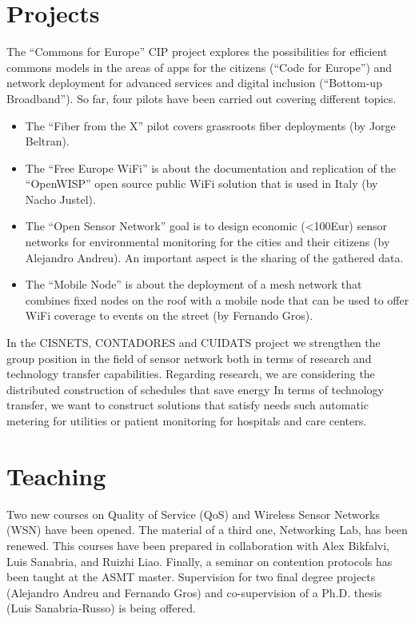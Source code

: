 \documentclass[a4paper,twocolumns]{article}%
\begin{document}
\section{Projects}

The ``Commons for Europe'' CIP project explores the possibilities for efficient commons models in the areas of apps for the citizens (``Code for Europe'') and network deployment for advanced services and digital inclusion (``Bottom-up Broadband'').
So far, four pilots have been carried out covering different topics.
\begin{itemize}
\item The ``Fiber from the X'' pilot covers grassroots fiber deployments (by Jorge Beltran).
\item The ``Free Europe WiFi'' is about the documentation and replication of the ``OpenWISP'' open source public WiFi solution that is used in Italy (by Nacho Justel).
\item The ``Open Sensor Network'' goal is to design economic (<100Eur) sensor networks for environmental monitoring for the cities and their citizens (by Alejandro Andreu). 
An important aspect is the sharing of the gathered data.
\item The ``Mobile Node'' is about the deployment of a mesh network that combines fixed nodes on the roof with a mobile node that can be used to offer WiFi coverage to events on the street (by Fernando Gros).
\end{itemize}

In the CISNETS, CONTADORES and CUIDATS project we strengthen the group position in the field of sensor network both in terms of research and technology transfer capabilities.
Regarding research, we are considering the distributed construction of schedules that save energy
In terms of technology transfer, we want to construct solutions that satisfy needs such automatic metering for utilities or patient monitoring for hospitals and care centers.

\section{Teaching}

Two new courses on Quality of Service (QoS) and Wireless Sensor Networks (WSN) have been opened.
The material of a third one, Networking Lab, has been renewed.
This courses have been prepared in collaboration with Alex Bikfalvi, Luis Sanabria, and Ruizhi Liao.
Finally, a seminar on contention protocols has been taught at the ASMT master.
Supervision for two final degree projects (Alejandro Andreu and Fernando Gros)  and co-supervision of a Ph.D. thesis (Luis Sanabria-Russo) is being offered.
\end{document}
